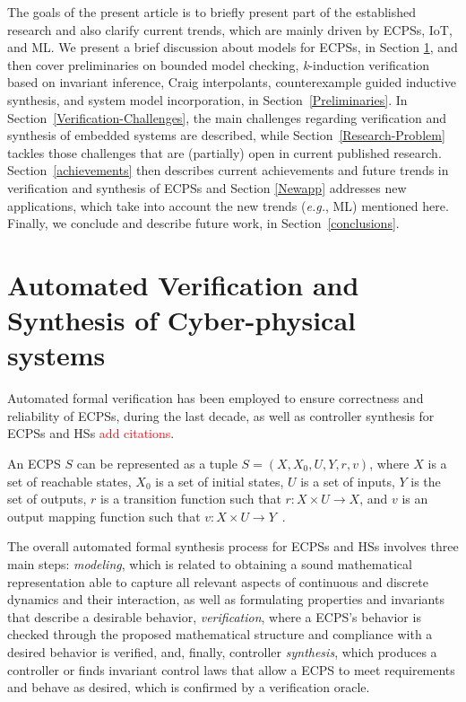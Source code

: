 \documentclass[format=acmsmall, review=false, screen=true]{acmart}
\begin{document}
The goals of the present article is to briefly present part of the established research and also clarify current trends, which are mainly driven by ECPSs, IoT, and ML. We present a brief discussion about models for ECPSs, in Section \ref{sec:model}, and then cover preliminaries on bounded model checking, \textit{k}-induction verification based on invariant inference, Craig interpolants, counterexample guided inductive synthesis, and system model incorporation, in Section~\ref{Preliminaries}. In Section~\ref{Verification-Challenges}, the main challenges regarding verification and synthesis of embedded systems are described, while Section~\ref{Research-Problem} tackles those challenges that are (partially) open in current published research. Section~\ref{achievements} then describes current achievements and future trends in verification and synthesis of ECPSs and Section \ref{Newapp} addresses new applications, which take into account the new trends ({\it e.g.}, ML) mentioned here. Finally, we conclude and describe future work, in Section~\ref{conclusions}.

\section{Automated Verification and Synthesis of Cyber-physical systems}
\label{sec:model}

Automated formal verification has been employed to ensure correctness and reliability of ECPSs, during the last decade, as well as controller synthesis for ECPSs and HSs \textcolor{red}{add citations}. 

An ECPS $S$ can be represented as a tuple $S=(X,X_{0},U,Y,r,v)$, where $X$ is a set of reachable states, $X_{0}$ is a set of initial states, $U$ is a set of inputs, $Y$ is the set of outputs, $r$ is a transition function such that $r:X\times U \rightarrow X$, and  $v$ is an output mapping function such that $v:X\times U \rightarrow Y$~\cite{Rungger16,Alur00,Girard11}.

The overall automated formal synthesis process for ECPSs and HSs involves three main steps: \textit{modeling}, which is related to obtaining a sound mathematical representation able to capture all relevant aspects of continuous and discrete dynamics and their interaction, as well as formulating properties and invariants that describe a desirable behavior, \textit{verification}, where a ECPS's behavior is checked through the proposed mathematical structure and compliance with a desired behavior is verified, and, finally, controller \textit{synthesis}, which produces a controller or finds invariant control laws that allow a ECPS to meet requirements and behave as desired, which is confirmed by a verification oracle. 
\end{document}
